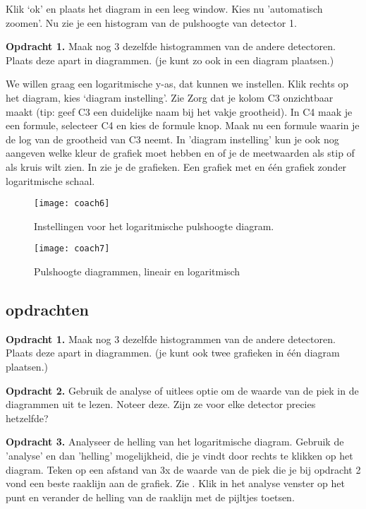 Klik `ok' en plaats het diagram in een leeg window. Kies nu 'automatisch zoomen'.
Nu zie je een histogram van de pulshoogte van detector 1.

\textbf{Opdracht 1.}
Maak nog 3 dezelfde histogrammen van de andere detectoren. Plaats deze apart in diagrammen.
(je kunt zo ook in een diagram plaatsen.)

We willen graag een logaritmische y-as, dat kunnen we instellen.
Klik rechts op het diagram, kies `diagram instelling'. Zie 
Zorg dat je kolom C3 onzichtbaar maakt (tip: geef C3 een duidelijke naam bij het vakje
grootheid). In C4 maak je een formule, selecteer C4 en kies de formule knop.
Maak nu een formule waarin je de log van de grootheid van C3 neemt.
In 'diagram instelling' kun je ook nog aangeven welke kleur de grafiek moet hebben en
of je de meetwaarden als stip of als kruis wilt zien. In  zie je
de grafieken. Een grafiek met en één grafiek zonder logaritmische schaal.


\begin{figure}
    \centering
    \texttt{[image: coach6]}
    \caption{Instellingen voor het logaritmische pulshoogte diagram.}
    \label{fig:coach6}
\end{figure}

\begin{figure}
    \centering
    \texttt{[image: coach7]}
    \caption{Pulshoogte diagrammen, lineair en logaritmisch}
    \label{fig:coach7}
\end{figure}


\subsection{opdrachten}
\label{sec:opdrachten}

\textbf{Opdracht 1.}
Maak nog 3 dezelfde histogrammen van de andere detectoren. Plaats deze apart in diagrammen.
(je kunt ook twee grafieken in één diagram plaatsen.)

\textbf{Opdracht 2.}
Gebruik de analyse of uitlees optie om de waarde van de piek in de diagrammen
uit te lezen. Noteer deze. Zijn ze voor elke detector precies hetzelfde?

\textbf{Opdracht 3.}
Analyseer de helling van het logaritmische diagram. Gebruik de 'analyse' en dan 'helling'
mogelijkheid, die je vindt door rechts te klikken op het diagram.
Teken op een afstand van 3x de waarde van de piek die je bij opdracht 2 vond een beste raaklijn aan de
grafiek. Zie . Klik in het analyse venster op het punt en verander
de helling van de raaklijn met de pijltjes toetsen.

